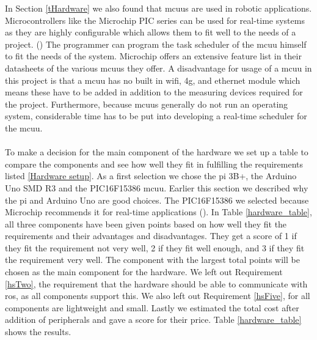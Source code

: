 \documentclass[12pt]{scrreprt}
\begin{document}
In Section \ref{tHardware} we also found that \gls{mcuu}s are used in robotic applications. Microcontrollers like the Microchip PIC series can be used for real-time systems as they are highly configurable which  allows them to fit well to the needs of a project. (\cite{micro}) The programmer can program the task scheduler of the \gls{mcuu} himself to fit the needs of the system. Microchip offers an extensive feature list in their datasheets of the various \gls{mcuu}s they offer. A disadvantage for usage of a \gls{mcuu} in this project is that a \gls{mcuu} has no built in \gls{wifi}, \gls{4g}, and ethernet module which means these have to be added in addition to the measuring devices required for the project. Furthermore, because \gls{mcuu}s generally do not run an operating system, considerable time has to be put into developing a real-time scheduler for the \gls{mcuu}.
\\\\
To make a decision for the main component of the hardware we set up a table to compare the components and see how well they fit in fulfilling the requirements listed \ref{Hardware setup}. As a first selection we chose the \gls{pi} 3B+, the Arduino Uno SMD R3 and the PIC16F15386 \gls{mcuu}. Earlier this section we described why the \gls{pi} and Arduino Uno are good choices. The PIC16F15386 we selected because Microchip recommends it for real-time applications (\cite{micro}).  In Table \ref{hardware_table}, all three components have been given points based on how well they fit the requirements and their advantages and disadvantages. They get a score of 1 if they fit the requirement not very well, 2 if they fit well enough, and 3 if they fit the requirement very well. The component with the largest total points will be chosen as the main component for the hardware. We left out Requirement \ref{hsTwo}, the requirement that the hardware should be able to communicate with \acrshort{ros}, as all components support this. We also left out Requirement \ref{hsFive}, for all components are lightweight and small. Lastly we estimated the total cost after addition of peripherals and gave a score for their price. Table \ref{hardware_table} shows the results.
\end{document}
